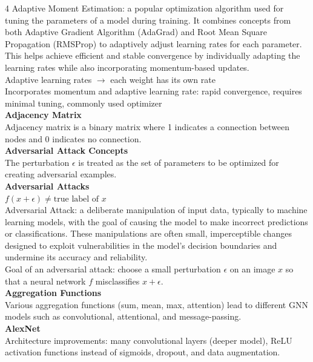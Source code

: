 \documentclass[8pt]{extarticle}
\begin{document}
\begin{multicols}{4}
Adaptive Moment Estimation: a popular optimization algorithm used for tuning the parameters of a model during training. It combines concepts from both Adaptive Gradient Algorithm (AdaGrad) and Root Mean Square Propagation (RMSProp) to adaptively adjust learning rates for each parameter. This helps achieve efficient and stable convergence by individually adapting the learning rates while also incorporating momentum-based updates.\\
Adaptive learning rates $\rightarrow$ each weight has its own rate\\
Incorporates momentum and adaptive learning rate: rapid convergence, requires minimal tuning, commonly used optimizer\\
\vspace{2pt}\textbf{Adjacency Matrix}\\
Adjacency matrix is a binary matrix where 1 indicates a connection between nodes and 0 indicates no connection.\\
\vspace{2pt}\textbf{Adversarial Attack Concepts}\\
The perturbation $\epsilon$ is treated as the set of parameters to be optimized for creating adversarial examples.\\
\vspace{2pt}\textbf{Adversarial Attacks}\\
$f(x + \epsilon) \neq \text{true label of } x$\\
Adversarial Attack: a deliberate manipulation of input data, typically to machine learning models, with the goal of causing the model to make incorrect predictions or classifications. These manipulations are often small, imperceptible changes designed to exploit vulnerabilities in the model’s decision boundaries and undermine its accuracy and reliability.\\
Goal of an adversarial attack: choose a small perturbation $\epsilon$ on an image $x$ so that a neural network $f$ misclassifies $x+\epsilon$.\\
\vspace{2pt}\textbf{Aggregation Functions}\\
Various aggregation functions (sum, mean, max, attention) lead to different GNN models such as convolutional, attentional, and message-passing.\\
\vspace{2pt}\textbf{AlexNet}\\
Architecture improvements: many convolutional layers (deeper model), ReLU activation functions instead of sigmoids, dropout, and data augmentation.\\

\end{multicols}
\end{document}
